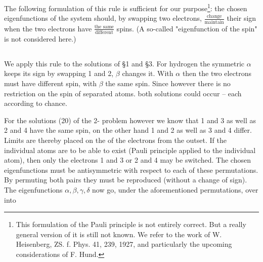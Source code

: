 \begin{paper}{1}
The following formulation of this rule is sufficient for our purpose\footnote{This formulation of the Pauli principle is not entirely correct. But a really general version of it is still not known. We refer to the work of W. Heisenberg, ZS. f. Phys. 41, 239, 1927, and particularly the upcoming considerations of F. Hund.}: the chosen eigenfunctions of the system should, by swapping two electrons, $\frac{\text{change}}{\text{maintain}}$ their sign when the two electrons have $\frac{\text{the same}}{\text{different}}$ spins. (A so-called "eigenfunction of the spin" is not considered here.)

\subsection{} We apply this rule to the solutions of \S1 and \S3. For hydrogen the symmetric $\alpha$ keeps its sign by swapping 1 and 2, $\beta$ changes it. With $\alpha$ then the two electrons must have different spin, with $\beta$ the same spin. Since however there is no restriction on the spin of separated atoms. both solutions could occur -- each according to chance.

For the solutions (20) of the 2- problem however we know that 1 and 3 as well as 2 and 4 have the same spin, on the other hand 1 and 2 as well as 3 and 4 differ. Limits are thereby placed on the  of the electrons from the outset. If the individual  atoms are to be able to exist (Pauli principle applied to the individual  atom), then only the electrons 1 and 3 or 2 and 4 may be switched. The chosen eigenfunctions must be antisymmetric with respect to each of these permutations. By permuting both pairs they must be reproduced (without a change of sign). The eigenfunctions $\alpha,\beta,\gamma,\delta$ now go, under the aforementioned permutations, over into


\end{paper}
